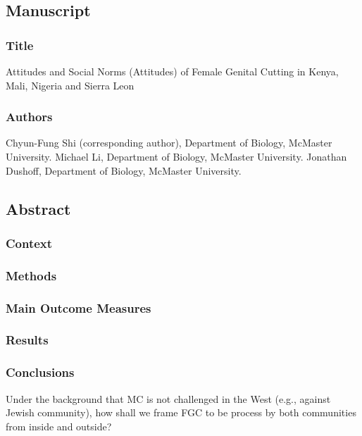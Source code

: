 \documentclass[12pt,]{article}
\date{}
\begin{document}
\subsection{Manuscript}\label{manuscript}

\subsubsection{Title}\label{title}

Attitudes and Social Norms (Attitudes) of Female Genital Cutting in Kenya, Mali, Nigeria and Sierra Leon

\subsubsection{Authors}\label{authors}

Chyun-Fung Shi (corresponding author), Department of Biology, McMaster
University. Michael Li, Department of Biology, McMaster University.
Jonathan Dushoff, Department of Biology, McMaster
University.

\subsection{Abstract}\label{abstract}

\subsubsection{Context}\label{context}

\subsubsection{}\label{objective}

\subsubsection{Methods}\label{Methods}

\subsubsection{Main Outcome Measures}\label{main-outcome-measures}

\subsubsection{Results}\label{results}

\subsubsection{Conclusions}\label{conclusions}
Under the background that MC is not challenged in the West (e.g., against Jewish community), how  shall we frame FGC to be process by both communities from inside and outside?
\end{document}
